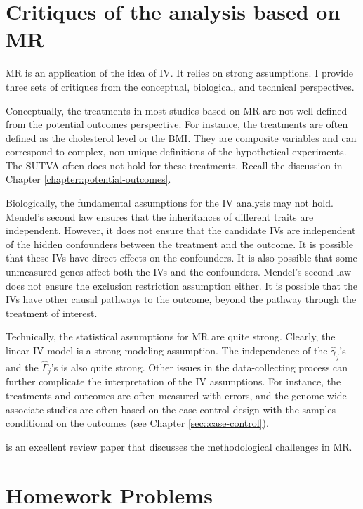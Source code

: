  
\section{Critiques of the analysis based on MR}




MR is an application of the idea of IV. It relies on strong assumptions. I provide three sets of critiques from the conceptual, biological, and technical perspectives. 



Conceptually, the treatments in most studies based on MR are not well defined from the potential outcomes perspective. For instance, the treatments are often defined as the cholesterol level or the BMI. They are composite variables and can correspond to complex, non-unique definitions of the hypothetical experiments. The SUTVA often does not hold for these treatments. Recall the discussion in Chapter \ref{chapter::potential-outcomes}. 


Biologically, the fundamental assumptions for the IV analysis may not hold. Mendel's second law ensures that the inheritances of different traits are independent. However, it does not ensure that the candidate IVs are independent of the hidden confounders between the treatment and the outcome. It is possible that these IVs have direct effects on the confounders. It is also possible that some unmeasured genes affect both the IVs and the confounders. Mendel's second law does not ensure the exclusion restriction assumption either. It is possible that the IVs have other causal pathways to the outcome, beyond the pathway through the treatment of interest. 


Technically, the statistical assumptions for MR are quite strong.  Clearly, the linear IV model is a strong modeling assumption. The independence of the $\hat\gamma_j$'s and the $\hat\Gamma_j$'s is also quite strong. Other issues in the data-collecting process can further complicate the interpretation of the IV assumptions. For instance, the treatments and outcomes are often measured with errors, and the genome-wide associate studies are often based on the case-control design with the samples conditional on the outcomes (see Chapter \ref{sec::case-control}).

 
\citet{vanderweele2014methodological} is an excellent review paper that discusses the methodological challenges in MR. 

 
 
\section{Homework Problems}

